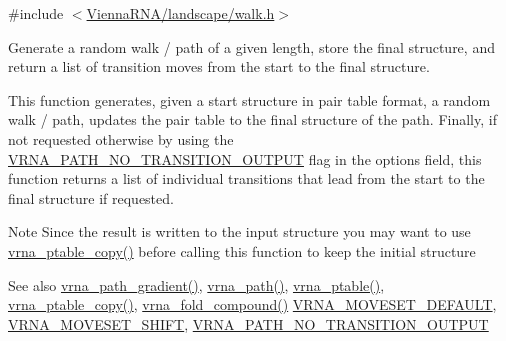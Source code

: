 {\ttfamily \#include $<$\mbox{\hyperlink{landscape_2walk_8h}{Vienna\+R\+N\+A/landscape/walk.\+h}}$>$}



Generate a random walk / path of a given length, store the final structure, and return a list of transition moves from the start to the final structure. 

This function generates, given a start structure in pair table format, a random walk / path, updates the pair table to the final structure of the path. Finally, if not requested otherwise by using the \mbox{\hyperlink{group__paths__walk_ga1ee63e54ecf136491e12ff03ede2622d}{V\+R\+N\+A\+\_\+\+P\+A\+T\+H\+\_\+\+N\+O\+\_\+\+T\+R\+A\+N\+S\+I\+T\+I\+O\+N\+\_\+\+O\+U\+T\+P\+UT}} flag in the {\ttfamily options} field, this function returns a list of individual transitions that lead from the start to the final structure if requested.

\begin{DoxyNote}{Note}
Since the result is written to the input structure you may want to use \mbox{\hyperlink{group__struct__utils__pair__table_ga2daefbbd6d9f8803731651882f54332d}{vrna\+\_\+ptable\+\_\+copy()}} before calling this function to keep the initial structure
\end{DoxyNote}
\begin{DoxySeeAlso}{See also}
\mbox{\hyperlink{group__paths__walk_ga9594d7424dbe301f0dd3f4900db0f05c}{vrna\+\_\+path\+\_\+gradient()}}, \mbox{\hyperlink{group__paths__walk_gaef7afadc36933b80706de49fe36e7b94}{vrna\+\_\+path()}}, \mbox{\hyperlink{group__struct__utils__pair__table_gae829fb8bb7f694c12a9c0bbc34c77c60}{vrna\+\_\+ptable()}}, \mbox{\hyperlink{group__struct__utils__pair__table_ga2daefbbd6d9f8803731651882f54332d}{vrna\+\_\+ptable\+\_\+copy()}}, \mbox{\hyperlink{group__fold__compound_ga6601d994ba32b11511b36f68b08403be}{vrna\+\_\+fold\+\_\+compound()}} \mbox{\hyperlink{group__neighbors_gaa5ffec4dd0d02df320f123e6888154d1}{V\+R\+N\+A\+\_\+\+M\+O\+V\+E\+S\+E\+T\+\_\+\+D\+E\+F\+A\+U\+LT}}, \mbox{\hyperlink{group__neighbors_ga68ea27c81de4b74e48b775c04052590b}{V\+R\+N\+A\+\_\+\+M\+O\+V\+E\+S\+E\+T\+\_\+\+S\+H\+I\+FT}}, \mbox{\hyperlink{group__paths__walk_ga1ee63e54ecf136491e12ff03ede2622d}{V\+R\+N\+A\+\_\+\+P\+A\+T\+H\+\_\+\+N\+O\+\_\+\+T\+R\+A\+N\+S\+I\+T\+I\+O\+N\+\_\+\+O\+U\+T\+P\+UT}}
\end{DoxySeeAlso}

